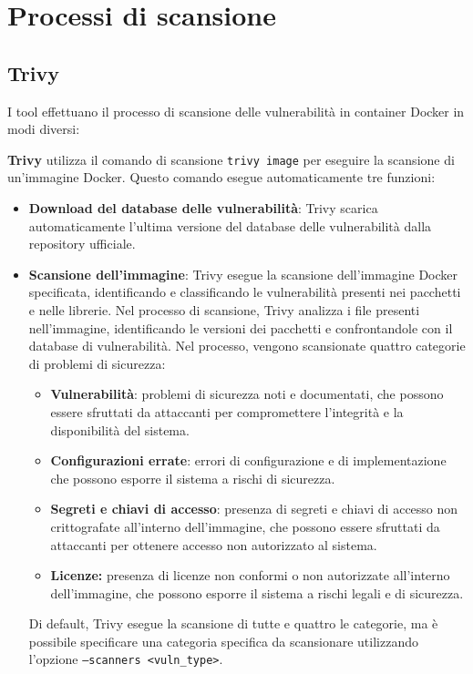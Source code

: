 \section{Processi di scansione}
\subsection{Trivy}
I tool effettuano il processo di scansione delle vulnerabilità in container Docker in modi diversi:

\textbf{Trivy} utilizza il comando di scansione \texttt{trivy image} per eseguire la scansione di un'immagine Docker\cite{trivy_docs}. Questo comando esegue automaticamente tre funzioni:
\begin{itemize}
   \item \textbf{Download del database delle vulnerabilità}: Trivy scarica automaticamente l'ultima versione del database delle vulnerabilità dalla repository ufficiale.
   \item \textbf{Scansione dell'immagine}: Trivy esegue la scansione dell'immagine Docker specificata, identificando e classificando le vulnerabilità presenti nei pacchetti e nelle librerie. Nel processo di scansione, Trivy analizza i file presenti nell'immagine, identificando le versioni dei pacchetti e confrontandole con il database di vulnerabilità. Nel processo, vengono scansionate quattro categorie di problemi di sicurezza:
         \begin{itemize}
            \item \textbf{Vulnerabilità}: problemi di sicurezza noti e documentati, che possono essere sfruttati da attaccanti per compromettere l'integrità e la disponibilità del sistema.
            \item \textbf{Configurazioni errate}: errori di configurazione e di implementazione che possono esporre il sistema a rischi di sicurezza.
            \item \textbf{Segreti e chiavi di accesso}: presenza di segreti e chiavi di accesso non crittografate all'interno dell'immagine, che possono essere sfruttati da attaccanti per ottenere accesso non autorizzato al sistema.
            \item \textbf{Licenze:} presenza di licenze non conformi o non autorizzate all'interno dell'immagine, che possono esporre il sistema a rischi legali e di sicurezza.
         \end{itemize}
         Di default, Trivy esegue la scansione di tutte e quattro le categorie, ma è possibile specificare una categoria specifica da scansionare utilizzando l'opzione \texttt{--scanners <vuln\_type>}.


\end{itemize}
